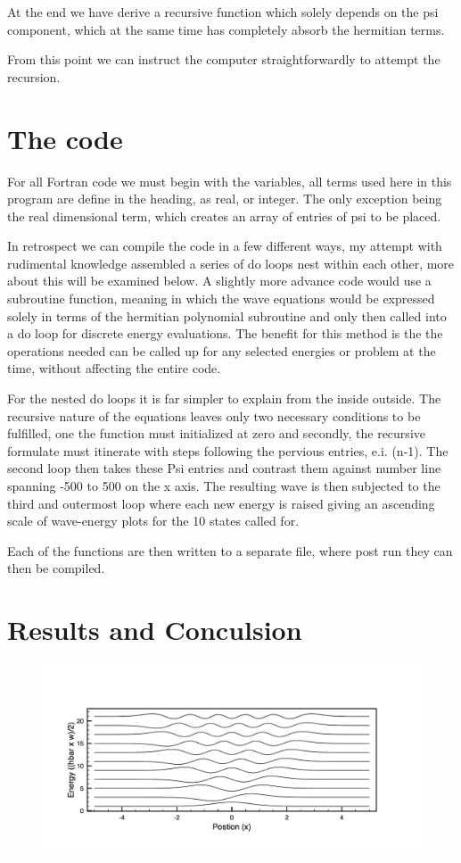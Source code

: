 \documentclass[12pt,letterpaper,notitlepage]{article}
\begin{document}
At the end we have derive a recursive function which solely depends on the psi component, which at the same time has completely absorb the hermitian terms. 

From this point we can instruct the computer straightforwardly to attempt the recursion. 

\section{The code}

For all Fortran code we must begin with the variables, all terms used here in this program are define in the heading, as real, or integer. The only exception being the real dimensional term, which creates an array of entries of psi to be placed. 

In retrospect we can compile the code in a few different ways, my attempt with rudimental knowledge assembled a series of do loops nest within each other, more about this will be examined below. A slightly more advance code would use a subroutine function, meaning in which the wave equations would be expressed solely in terms of the hermitian polynomial subroutine and only then called into a do loop for discrete energy evaluations. The benefit for this method is the the operations needed can be called up for any selected energies or problem at the time, without affecting the entire code. 

For the nested do loops it is far simpler to explain from the inside outside. The recursive nature of the equations leaves only two necessary conditions to be fulfilled, one the function must initialized at zero and secondly, the recursive formulate must itinerate with steps following the pervious entries,  e.i. (n-1).
The second loop then takes these Psi entries and contrast them against number line spanning -500 to 500 on the x axis. The resulting wave is then subjected to the third and outermost loop where each new energy is raised giving an ascending scale of wave-energy plots for the 10 states called for. 

Each of the functions are then written to a separate file, where post run they can then be compiled.

\section{Results and Conculsion}

	\begin{figure}[htb]
		\includegraphics[width=1.\textwidth]{energies.png}
	\end{figure}
\end{document}
